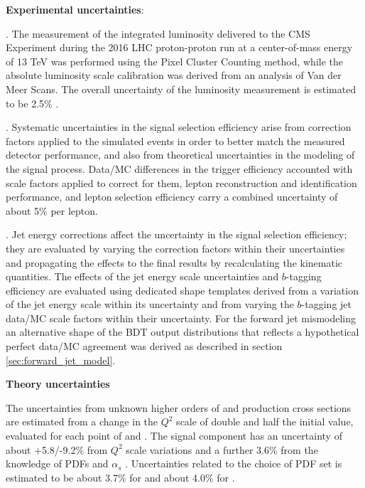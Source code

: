 \textbf{Experimental uncertainties}:

\bit
\item {}. The measurement of the integrated luminosity delivered to the CMS Experiment during the 2016 LHC proton-proton run at a center-of-mass energy of 13 TeV was performed using the Pixel Cluster Counting method, while the absolute luminosity scale calibration was derived from an analysis of Van der Meer Scans. The overall uncertainty of the luminosity measurement is estimated to be 2.5\% \cite{lumi}.

\item {}. Systematic uncertainties in the signal selection efficiency arise from correction factors applied to the simulated events in order to better match the measured detector performance, and also from theoretical uncertainties in the modeling of the signal process. Data/MC differences in the trigger efficiency accounted with scale factors applied to correct for them, lepton reconstruction and identification performance, and lepton selection efficiency carry a combined uncertainty of about 5\% per lepton.

\item {}. Jet energy corrections affect the uncertainty in the signal selection efficiency; they are evaluated by varying the correction factors within their uncertainties and propagating the effects to the final results by recalculating the kinematic quantities. The effects of the jet energy scale uncertainties and $b$-tagging efficiency are evaluated using dedicated shape templates derived from a variation of the jet energy scale within its uncertainty and from varying the $b$-tagging jet data/MC scale factors within their uncertainty. For the forward jet mismodeling an alternative shape of the BDT output distributions that reflects a hypothetical perfect data/MC agreement was derived as described in section \ref{sec:forward_jet_model}.

\eit

\textbf{Theory uncertainties}

The uncertainties from unknown higher orders of \tHq and \tHW production cross sections are estimated from a change in the $Q^2$ scale of double and half the initial value, evaluated for each point of \Ct and \CV. The \ttH signal component has an uncertainty of about +5.8/-9.2\% from $Q^2$ scale variations and a further 3.6\% from the knowledge of PDFs and $\alpha_s $ \cite{yellow}. Uncertainties related to the choice of PDF set is estimated to be about 3.7\% for \tHq and about 4.0\% for \tHW.

